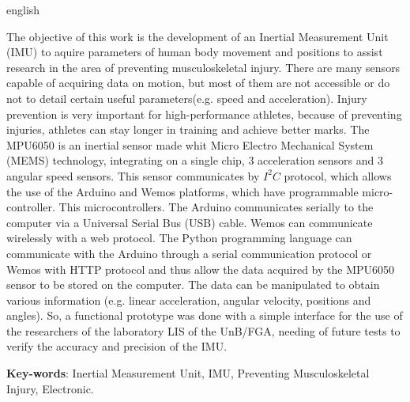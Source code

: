 \begin{resumo}[Abstract]
 \begin{otherlanguage*}{english}
 	
 	The objective of this work is the development of an Inertial Measurement Unit (IMU) to aquire parameters of human body movement and positions to assist research in the area of preventing musculoskeletal injury. There are many sensors capable of acquiring data on motion, but most of them are not accessible or do not to detail certain useful parameters(e.g. speed and acceleration). Injury prevention is very important for high-performance athletes, because of preventing injuries, athletes can stay longer in training and achieve better marks. The MPU6050 is an inertial sensor made whit Micro Electro Mechanical System (MEMS) technology, integrating on a single chip, 3 acceleration sensors and 3 angular speed sensors. This sensor communicates by $I^2C$ protocol, which allows the use of the Arduino and Wemos platforms, which have programmable micro-controller. This microcontrollers. The Arduino communicates serially to the computer via a Universal  Serial Bus (USB) cable. Wemos can communicate wirelessly with a web protocol. The Python programming language can communicate with the Arduino through a serial communication protocol or Wemos with HTTP protocol and thus allow the data acquired by the MPU6050 sensor to be stored on the computer. The data can be manipulated to obtain various information (e.g. linear acceleration, angular velocity, positions and angles). So, a functional prototype was done with a simple interface for the use of the researchers of the laboratory LIS of the UnB/FGA, needing of future tests to verify the accuracy and precision of the IMU.

   \vspace{\onelineskip}
 
   \noindent 
   \textbf{Key-words}: Inertial Measurement Unit, IMU, Preventing Musculoskeletal Injury, Electronic.
 \end{otherlanguage*}
\end{resumo}

